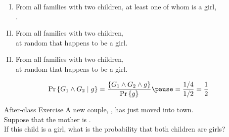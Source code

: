\begin{frame}{}
  \centerline{}

  \pause
  \vspace{0.30cm}
  \begin{columns}
  \end{columns}

  \pause
  \vspace{0.80cm}
  \begin{enumerate}[(I)]
    \setlength{\itemsep}{8pt}
    \item From all families with two children, at least one of whom is a girl, \\
      .
    \pause
    \item From all families with two children,  \\
      at random that happens to be a girl.
  \end{enumerate}
\end{frame}

\begin{frame}{}
  \centerline{}

  \vspace{0.60cm}
  \begin{enumerate}[(I)]
    \setcounter{enumi}{1}
    \item {} From all families with two children,  \\
      at random that happens to be a girl.
  \end{enumerate}

  \pause
  \vspace{0.50cm}
  \[
    \Pr\set{G_1 \land G_2 \mid g} = \frac{\set{G_1 \land G_2 \land g}}{\Pr\set{g}} \pause = \frac{1/4}{1/2} = \frac{1}{2}
  \]
\end{frame}

\begin{frame}{}
  \begin{exampleblock}{After-class Exercise}
    A new couple, , has just moved into town. \\
    Suppose that the mother is . \\
    If this child is a girl, what is the probability that both children are girls?
  \end{exampleblock}

  \vspace{0.50cm}
\end{frame}

